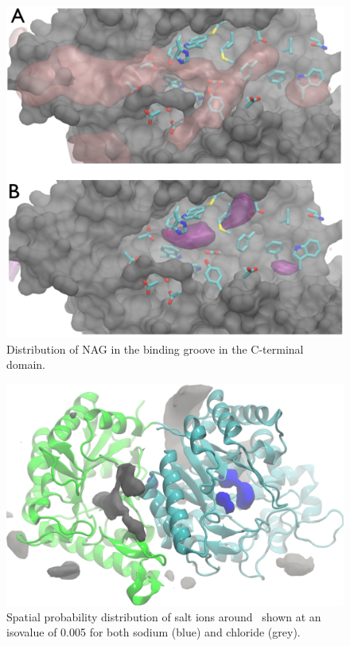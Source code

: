 \begin{figure}[htbp]
\centering
\includegraphics[width=6.25in]{figures/results4/cterm_groove_surf.pdf}
\caption{Distribution of NAG in the binding groove in the C-terminal domain.}
\label{fig:groove}
\end{figure}

\begin{figure}[htbp]
\centering
\includegraphics[width=6.25in]{figures/results4/pgab_glucosamine_salt_densities.pdf}
\caption[Ionic distribution]{Spatial probability distribution of salt ions around \pgab\ shown at an isovalue of 0.005 for both sodium (blue) and chloride (grey).}
\label{fig:salt_density_distribution}
\end{figure}

